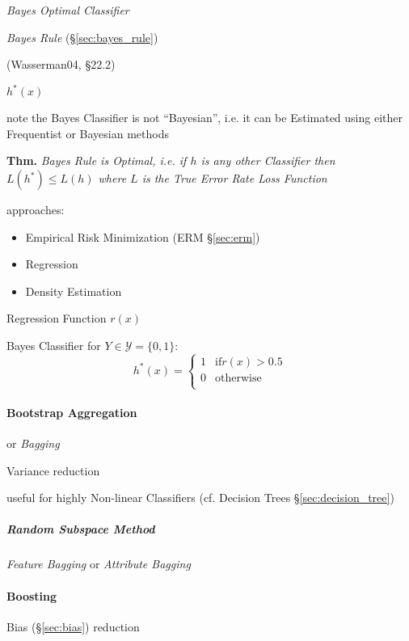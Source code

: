 \emph{Bayes Optimal Classifier}

\emph{Bayes Rule} (\S\ref{sec:bayes_rule})

(Wasserman04, \S22.2)

$h^*(x)$

note the Bayes Classifier is not ``Bayesian'', i.e. it can be Estimated using
either Frequentist or Bayesian methods

\textbf{Thm.} \emph{Bayes Rule is Optimal, i.e. if $h$ is any other Classifier
  then $L(h^*) \leq L(h)$ where $L$ is the True Error Rate Loss Function}

approaches:
\begin{itemize}
  \item Empirical Risk Minimization (ERM \S\ref{sec:erm})
  \item Regression
  \item Density Estimation
\end{itemize}

Regression Function $r(x)$

Bayes Classifier for $Y \in \mathcal{Y} = \{0, 1\}$:
\[
  h^*(x) = \begin{cases}
    1 & \text{if} r(x) > 0.5 \\
    0 & \text{otherwise} \\
  \end{cases}
\]



\paragraph{Bootstrap Aggregation}\label{sec:bootstrap_aggregation}\hfill

or \emph{Bagging}

Variance reduction

useful for highly Non-linear Classifiers (cf. Decision Trees
\S\ref{sec:decision_tree})



\subparagraph{Random Subspace Method}\label{sec:random_subspace_method}\hfill

\emph{Feature Bagging} or \emph{Attribute Bagging}



\paragraph{Boosting}\label{sec:boosting}\hfill

Bias (\S\ref{sec:bias}) reduction

